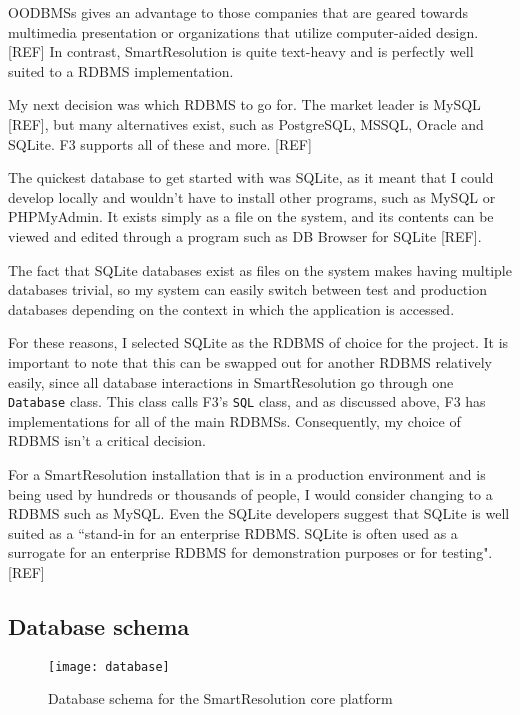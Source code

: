 OODBMSs gives an advantage to those companies that are geared towards multimedia presentation or organizations that utilize computer-aided design. [REF] In contrast, SmartResolution is quite text-heavy and is perfectly well suited to a RDBMS implementation. %

My next decision was which RDBMS to go for. The market leader is MySQL [REF], but many alternatives exist, such as PostgreSQL, MSSQL, Oracle and SQLite. F3 supports all of these and more. [REF] %

The quickest database to get started with was SQLite, as it meant that I could develop locally and wouldn't have to install other programs, such as MySQL or PHPMyAdmin. It exists simply as a file on the system, and its contents can be viewed and edited through a program such as DB Browser for SQLite [REF]. %

The fact that SQLite databases exist as files on the system makes having multiple databases trivial, so my system can easily switch between test and production databases depending on the context in which the application is accessed.

For these reasons, I selected SQLite as the RDBMS of choice for the project. It is important to note that this can be swapped out for another RDBMS relatively easily, since all database interactions in SmartResolution go through one \lstinline{Database} class. This class calls F3's \lstinline{SQL} class, and as discussed above, F3 has implementations for all of the main RDBMSs. Consequently, my choice of RDBMS isn't a critical decision.

For a SmartResolution installation that is in a production environment and is being used by hundreds or thousands of people, I would consider changing to a RDBMS such as MySQL. Even the SQLite developers suggest that SQLite is well suited as a ``stand-in for an enterprise RDBMS. SQLite is often used as a surrogate for an enterprise RDBMS for demonstration purposes or for testing". [REF] %

\subsection{Database schema}

\begin{figure}[h!]
  \centering
    \ifimages
    \texttt{[image: database]}
    \fi
  \caption{Database schema for the SmartResolution core platform}
  \label{uml:databaseSchema}
\end{figure}

